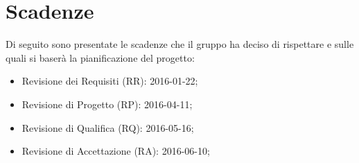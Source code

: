 \section{Scadenze}
Di seguito sono presentate le scadenze che il gruppo ha deciso di rispettare e sulle quali si baserà la pianificazione del progetto:
\begin{itemize}
\item Revisione dei Requisiti (RR): 2016-01-22;
\item Revisione di Progetto (RP): 2016-04-11;
\item Revisione di Qualifica (RQ): 2016-05-16;
\item Revisione di Accettazione (RA): 2016-06-10;
\end{itemize}
